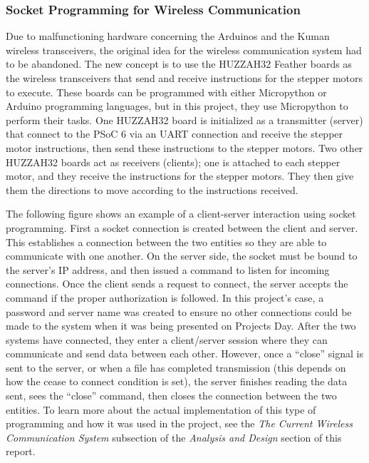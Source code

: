 \subsubsection{Socket Programming for Wireless Communication}
 Due to malfunctioning hardware concerning the Arduinos and the Kuman wireless transceivers, the original idea for the wireless communication system had to be abandoned. The new concept is to use the HUZZAH32 Feather boards as the wireless transceivers that send and receive instructions for the stepper motors to execute. These boards can be programmed with either Micropython or Arduino programming languages, but in this project, they use Micropython to perform their tasks. One HUZZAH32 board is initialized as a transmitter (server) that connect to the PSoC 6 via an UART connection and receive the stepper motor instructions, then send these instructions to the stepper motors. Two other HUZZAH32 boards act as receivers (clients); one is attached to each stepper motor, and they receive the instructions for the stepper motors. They then give them the directions to move according to the instructions received. \par
 \setlength{\parindent}{2.5ex}
 The following figure shows an example of a client-server interaction using socket programming. First a socket connection is created between the client and server. This establishes a connection between the two entities so they are able to communicate with one another. On the server side, the socket must be bound to the server's IP address, and then issued a command to listen for incoming connections. Once the client sends a request to connect, the server accepts the command if the proper authorization is followed. In this project's case, a password and server name was created to ensure no other connections could be made to the system when it was being presented on Projects Day. After the two systems have connected, they enter a client/server session where they can communicate and send data between each other. However, once a ``close'' signal is sent to the server, or when a file has completed transmission (this depends on how the cease to connect condition is set), the server finishes reading the data sent, sees the ``close'' command, then closes the connection between the two entities. To learn more about the actual implementation of this type of programming and how it was used in the project, see the \textit{The Current Wireless Communication System} subsection of the \textit{Analysis and Design} section of this report.
 
